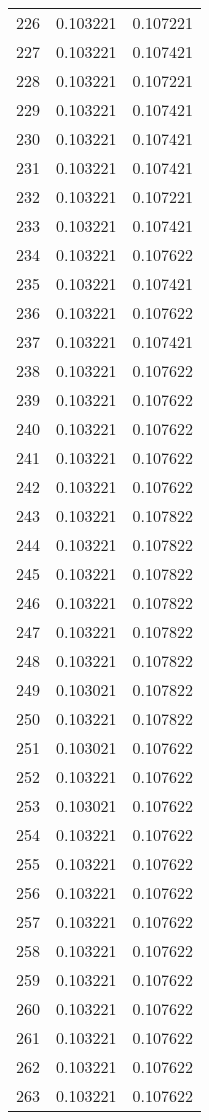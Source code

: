 \begin{longtable}{rrr}
226 & 0.103221 & 0.107221 \\
227 & 0.103221 & 0.107421 \\
228 & 0.103221 & 0.107221 \\
229 & 0.103221 & 0.107421 \\
230 & 0.103221 & 0.107421 \\
231 & 0.103221 & 0.107421 \\
232 & 0.103221 & 0.107221 \\
233 & 0.103221 & 0.107421 \\
234 & 0.103221 & 0.107622 \\
235 & 0.103221 & 0.107421 \\
236 & 0.103221 & 0.107622 \\
237 & 0.103221 & 0.107421 \\
238 & 0.103221 & 0.107622 \\
239 & 0.103221 & 0.107622 \\
240 & 0.103221 & 0.107622 \\
241 & 0.103221 & 0.107622 \\
242 & 0.103221 & 0.107622 \\
243 & 0.103221 & 0.107822 \\
244 & 0.103221 & 0.107822 \\
245 & 0.103221 & 0.107822 \\
246 & 0.103221 & 0.107822 \\
247 & 0.103221 & 0.107822 \\
248 & 0.103221 & 0.107822 \\
249 & 0.103021 & 0.107822 \\
250 & 0.103221 & 0.107822 \\
251 & 0.103021 & 0.107622 \\
252 & 0.103221 & 0.107622 \\
253 & 0.103021 & 0.107622 \\
254 & 0.103221 & 0.107622 \\
255 & 0.103221 & 0.107622 \\
256 & 0.103221 & 0.107622 \\
257 & 0.103221 & 0.107622 \\
258 & 0.103221 & 0.107622 \\
259 & 0.103221 & 0.107622 \\
260 & 0.103221 & 0.107622 \\
261 & 0.103221 & 0.107622 \\
262 & 0.103221 & 0.107622 \\
263 & 0.103221 & 0.107622 \\

\end{longtable}
